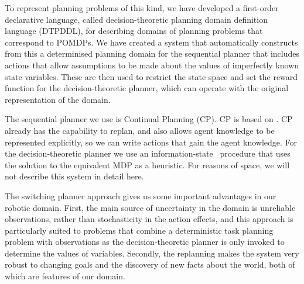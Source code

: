 To represent planning problems of this kind, we have developed a
first-order declarative language, called decision-theoretic planning
domain definition language (DTPDDL), for describing domains of
planning problems that correspond to POMDPs. We have created a system
that automatically constructs from this a determinised planning domain
for the sequential planner that includes actions that allow
assumptions to be made about the values of imperfectly known state
variables. These are then used to restrict the state space and set the
reward function for the decision-theoretic planner, which can operate
with the original representation of the domain.

The sequential planner we use is Continual
Planning \cite{brenner:nebel:jaamas09} (CP). CP is based
on \fastdownward \cite{fast-downward}. CP already has the capability
to replan, and also allows agent knowledge to be represented
explicitly, so we can write actions that gain the agent knowledge. For
the decision-theoretic planner we use an information-state
\laostar\ procedure that uses the solution to the equivalent MDP as a
heuristic. For reasons of space, we will not describe this system in
detail here.

The switching planner approach gives us some important advantages in
our robotic domain. First, the main source of uncertainty in the
domain is unreliable observations, rather than stochasticity in the
action effects, and this approach is particularly suited to problems
that combine a deterministic task planning problem with observations
as the decision-theoretic planner is only invoked to determine the
values of variables. Secondly, the replanning makes the system very
robust to changing goals and the discovery of new facts about the
world, both of which are features of our domain.












